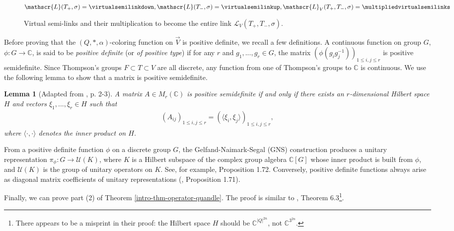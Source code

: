 \documentclass[11pt, twoside]{amsart}
\numberwithin{equation}{section}
\newtheorem{lemma}[theorem]{Lemma}
\theoremstyle{definition}
\numberwithin{equation}{section}
\begin{document}
\begin{figure}[h!]
    \centering
    $ \mathscr{L}(T_+,\sigma)=\virtualsemilinkdown, \mathscr{L}(T_-,\sigma)=\virtualsemilinkup, \mathscr{L}_V(T_+, T_-, \sigma)=\multipliedvirtualsemilinks$
    \caption{Virtual semi-links and their multiplication to become the entire link $\mathscr{L}_V(T_+, T_-, \sigma).$}
    \label{fig:virtual_semilinks}
\end{figure}

Before proving that the $(Q,*,\alpha)$-coloring function on $\vec{V}$ is positive definite, we recall a few definitions. A continuous function on  group $G$, $\phi:G \to \mathbb{C}$, is said to be \textit{positive definite} (or \textit{of positive type}) if for any $r$ and $g_1,...,g_r\in G$, the matrix $(\phi(g_ig_j^{-1}))_{1\leq i,j \leq r}$ is positive semidefinite. Since Thompson's groups $F\subset T \subset V$ are all discrete, any function from one of Thompson's groups to $\mathbb{C}$ is continuous. We use the following lemma to show that a matrix is positive semidefinite.

\begin{lemma}[Adapted from \cite{Bha07}, p. 2-3]
    A matrix $A\in M_r(\mathbb{C})$ is positive semidefinite if and only if there exists an $r$-dimensional Hilbert space $H$ and vectors $\xi_1,...,\xi_r\in H$ such that
    \begin{align*}
        (A_{ij})_{1\leq i,j \leq r}=(\langle \xi_i,\xi_j\rangle)_{1\leq i,j \leq r},
    \end{align*}
    where $\langle \cdot, \cdot\rangle$ denotes the inner product on $H$.
\end{lemma}

    From a positive definite function $\phi$ on a discrete group $G$, the Gelfand-Naimark-Segal (GNS) construction produces a unitary representation  $\pi_\phi: G \to \mathcal{U}(K)$, where $K$ is a Hilbert subspace of the complex group algebra $\mathbb{C}[G]$ whose inner product is built from $\phi$, and $\mathcal{U}(K)$ is the group of unitary operators on $K$. See, for example, \cite{EW2025} Proposition 1.72. Conversely, positive definite functions always arise as diagonal matrix coefficients of unitary representations (\cite{EW2025}, Proposition 1.71).
    

Finally, we can prove part (2) of Theorem \ref{intro-thm-operator-quandle}. The proof is similar to \cite{AC19}, Theorem 6.3\footnote{There appears to be a misprint in their proof: the Hilbert space $H$ should be $\mathbb{C}^{|Q|^{2n}}$, not $\mathbb{C}^{3^{2n}}$.}.
\end{document}
